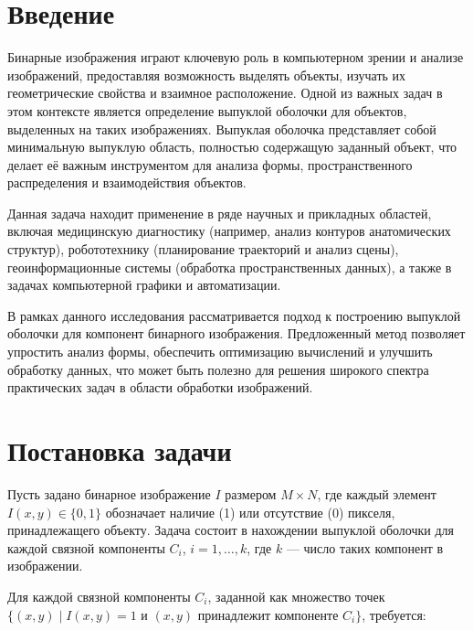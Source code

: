 \documentclass{report}
\begin{document}
\setcounter{page}{2}
\tableofcontents

\newpage

\newpage
\section*{Введение}

Бинарные изображения играют ключевую роль в компьютерном зрении и анализе изображений, предоставляя возможность выделять объекты, изучать их геометрические свойства и взаимное расположение. Одной из важных задач в этом контексте является определение выпуклой оболочки для объектов, выделенных на таких изображениях. Выпуклая оболочка представляет собой минимальную выпуклую область, полностью содержащую заданный объект, что делает её важным инструментом для анализа формы, пространственного распределения и взаимодействия объектов. 

Данная задача находит применение в ряде научных и прикладных областей, включая медицинскую диагностику (например, анализ контуров анатомических структур), робототехнику (планирование траекторий и анализ сцены), геоинформационные системы (обработка пространственных данных), а также в задачах компьютерной графики и автоматизации. 

В рамках данного исследования рассматривается подход к построению выпуклой оболочки для компонент бинарного изображения. Предложенный метод позволяет упростить анализ формы, обеспечить оптимизацию вычислений и улучшить обработку данных, что может быть полезно для решения широкого спектра практических задач в области обработки изображений.
\newpage

\section*{Постановка задачи}  

Пусть задано бинарное изображение \( I \) размером \( M \times N \), где каждый элемент \( I(x, y) \in \{0, 1\} \) обозначает наличие (1) или отсутствие (0) пикселя, принадлежащего объекту. Задача состоит в нахождении выпуклой оболочки для каждой связной компоненты \( C_i \), \( i = 1, \dots, k \), где \( k \) — число таких компонент в изображении.  

Для каждой связной компоненты \( C_i \), заданной как множество точек \( \{(x, y) \mid I(x, y) = 1 \text{ и } (x, y) \text{ принадлежит компоненте } C_i\} \), требуется:  
\end{document}
